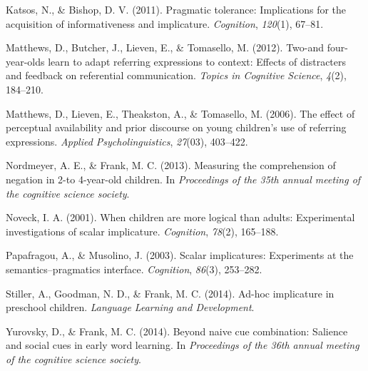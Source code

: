 \documentclass[a4paper,man,apacite,floatsintext]{apa6}
\begin{document}
Katsos, N., \& Bishop, D. V. (2011). Pragmatic tolerance: Implications
for the acquisition of informativeness and implicature.
\emph{Cognition}, \emph{120}(1), 67--81.

Matthews, D., Butcher, J., Lieven, E., \& Tomasello, M. (2012). Two-and
four-year-olds learn to adapt referring expressions to context: Effects
of distracters and feedback on referential communication. \emph{Topics
in Cognitive Science}, \emph{4}(2), 184--210.

Matthews, D., Lieven, E., Theakston, A., \& Tomasello, M. (2006). The
effect of perceptual availability and prior discourse on young
children's use of referring expressions. \emph{Applied
Psycholinguistics}, \emph{27}(03), 403--422.

Nordmeyer, A. E., \& Frank, M. C. (2013). Measuring the comprehension of
negation in 2-to 4-year-old children. In \emph{Proceedings of the 35th
annual meeting of the cognitive science society}.

Noveck, I. A. (2001). When children are more logical than adults:
Experimental investigations of scalar implicature. \emph{Cognition},
\emph{78}(2), 165--188.

Papafragou, A., \& Musolino, J. (2003). Scalar implicatures: Experiments
at the semantics--pragmatics interface. \emph{Cognition}, \emph{86}(3),
253--282.

Stiller, A., Goodman, N. D., \& Frank, M. C. (2014). Ad-hoc implicature
in preschool children. \emph{Language Learning and Development}.

Yurovsky, D., \& Frank, M. C. (2014). Beyond naive cue combination:
Salience and social cues in early word learning. In \emph{Proceedings of
the 36th annual meeting of the cognitive science society}.


\end{document}
